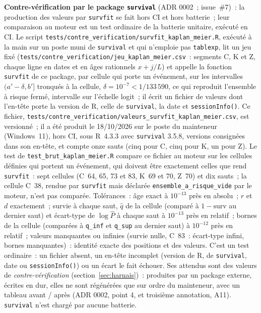 \documentclass[a4paper,11pt]{article}
\newcommand{\code}[1]{\texttt{\small #1}}
\begin{document}
\medskip
\textbf{Contre-vérification par le package \code{survival}} (ADR 0002~;
issue~\#7)~: la production des valeurs par \code{survfit} se fait hors CI et
hors batterie~; leur comparaison au moteur est un test ordinaire de la
batterie unitaire, exécuté en CI. Le script
\code{tests/contre\_verification/}\allowbreak\code{survfit\_kaplan\_meier.R}, exécuté à la main
sur un poste muni de \code{survival} et qui n'emploie pas \code{tablexp}, lit
un jeu fixé (\code{tests/contre\_verification/}\allowbreak\code{jeu\_kaplan\_meier.csv}~:
segments C, K et Z, chaque ligne en dates et en âges rationnels $x + j/L$) et
appelle la fonction \code{survfit} de ce package, par cellule qui porte un
événement, sur les intervalles $(a' - \delta, b']$ tronqués à la cellule,
$\delta = 10^{-7} < 1/133\,590$, ce qui reproduit l'ensemble à risque fermé,
intervalle sur l'échelle logit~; il écrit un fichier de valeurs dont
l'en-tête porte la version de R, celle de \code{survival}, la date et
\code{sessionInfo()}. Ce fichier,
\code{tests/contre\_verification/}\allowbreak\code{valeurs\_survfit\_kaplan\_meier.csv},
est versionné~; il a été produit le 18/10/2026 sur le poste du mainteneur
(Windows~11), hors CI, sous R~4.3.3 avec \code{survival} 3.5.8, versions
consignées dans son en-tête, et compte onze sauts (cinq pour C, cinq pour K,
un pour Z). Le test de \code{test\_brut\_kaplan\_meier.R} compare ce
fichier au moteur sur les cellules définies qui portent un événement, qui
doivent être exactement celles que rend \code{survfit}~: sept cellules (C~64,
65, 73 et 83, K~69 et 70, Z~70) et dix sauts~; la cellule C~38, rendue par
\code{survfit} mais déclarée \code{ensemble\_a\_risque\_vide} par le moteur,
n'est pas comparée. Tolérances~: âge exact à $10^{-13}$ près en
absolu~; $r$ et $d$ exactement~; survie à chaque saut, $\hat q$ de la cellule
(comparé à $1 - \text{surv}$ au dernier saut) et écart-type de $\log \hat P$ à
chaque saut à $10^{-13}$ près en relatif~; bornes de la cellule (comparées à
\code{q\_inf} et \code{q\_sup} au dernier saut) à $10^{-12}$ près en
relatif~; valeurs manquantes ou infinies (survie nulle, C~83~: écart-type
infini, bornes manquantes)~: identité exacte des positions et des valeurs.
C'est un test ordinaire~: un fichier absent, un en-tête incomplet
(version de R, de \code{survival}, date ou \code{sessionInfo()}) ou un écart
le fait échouer. Ses attendus sont des valeurs de
\emph{contre-vérification} (section~\ref{sec:harnais})~: produites par un
package externe, écrites en dur, elles ne sont régénérées que sur ordre du
mainteneur, avec un tableau avant / après (ADR 0002, point 4,
et troisième annotation, A11).
\code{survival} n'est chargé par aucune batterie.
\end{document}
